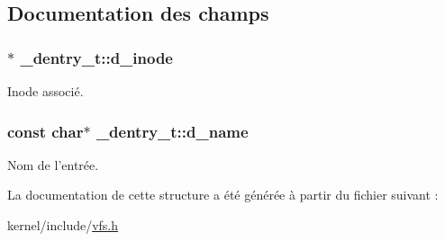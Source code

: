 \subsection{\-Documentation des champs}
\hypertarget{struct__dentry__t_ac711731a0c08b35b5d2731b8545c7454}{
\subsubsection[{d\-\_\-inode}]{$\ast$ {\bf \-\_\-dentry\-\_\-t\-::d\-\_\-inode}}}\label{struct__dentry__t_ac711731a0c08b35b5d2731b8545c7454}
\-Inode associé. \hypertarget{struct__dentry__t_ac9b991f6f5d5c5ce60e8d256d667265e}{
\subsubsection[{d\-\_\-name}]{\setlength{\rightskip}{0pt plus 5cm}const char$\ast$ {\bf \-\_\-dentry\-\_\-t\-::d\-\_\-name}}}\label{struct__dentry__t_ac9b991f6f5d5c5ce60e8d256d667265e}
\-Nom de l'entrée. 

\-La documentation de cette structure a été générée à partir du fichier suivant \-:\begin{DoxyCompactItemize}
\item 
kernel/include/\hyperlink{vfs_8h}{vfs.\-h}\end{DoxyCompactItemize}
